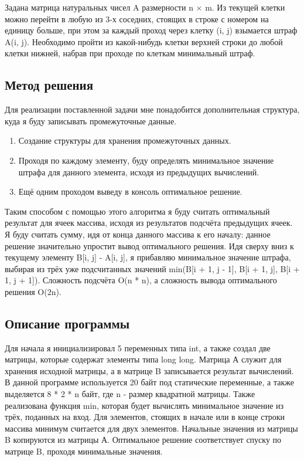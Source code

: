 \documentclass[12pt]{article}
\begin{document}
Задана матрица натуральных чисел A размерности n × m. Из текущей клетки можно перейти в любую из 3-х соседних, стоящих в строке с номером на единицу больше, при этом за каждый проход через клетку (i, j) взымается штраф A(i, j). Необходимо пройти из какой-нибудь клетки верхней строки до любой клетки нижней, набрав при проходе по клеткам минимальный штраф.

\subsection*{Метод решения}

Для реализации поставленной задачи мне понадобится дополнительная структура, куда я буду записывать промежуточные данные.

\begin{enumerate}
\item Создание структуры для хранения промежуточных данных.
\item Проходя по каждому элементу, буду определять минимальное значение штрафа для данного элемента, исходя из предыдущих вычислений.
\item Ещё одним проходом выведу в консоль оптимальное решение.
\end{enumerate}

Таким способом с помощью этого алгоритма я буду считать оптимальный результат для ячеек массива, исходя из результатов подсчёта предыдущих ячеек. Я буду считать сумму, идя от конца данного массива к его началу: данное решение значительно упростит вывод оптимального решения. Идя сверху вниз к текущему элементу B[i, j] - A[i, j], я прибавляю минимальное значение штрафа, выбирая из трёх уже подсчитанных значений min(B[i + 1, j - 1], B[i + 1, j], B[i + 1, j + 1]). Сложность подсчёта O(n * n), а сложность вывода оптимального решения O(2n).

\subsection*{Описание программы}

Для начала я инициализировал 5 переменных типа int, а также создал две матрицы, которые содержат элементы типа long long. Матрица А служит для хранения исходной матрицы, а в матрице B записывается результат вычислений. В данной программе используется 20 байт под статические переменные, а также выделяется 8 * 2 * n байт, где n - размер квадратной матрицы. Также реализована функция min, которая будет вычислять минимальное значение из трёх, поданных на вход. Для элементов, стоящих в начале или в конце строки массива минимум считается для двух элементов. Начальные значения из матрицы B копируются из матрицы А. Оптимальное решение соответствует спуску по матрице B, проходя минимальные значения. 
\end{document}

